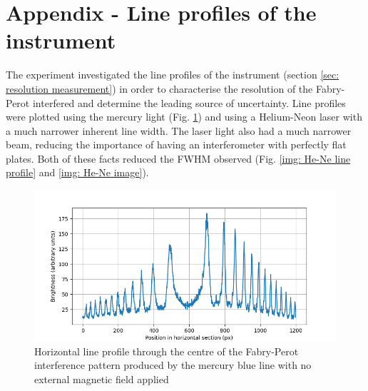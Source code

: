 \documentclass[11pt]{article}
\begin{document}
\section{Appendix - Line profiles of the instrument} \label{sec: Line profiles}
The experiment investigated the line profiles of the instrument (section \ref{sec: resolution measurement}) in order to characterise the resolution of the Fabry-Perot interfered and determine the leading source of uncertainty. Line profiles were plotted using the mercury light (Fig. \ref{img: Hg line profile}) and using a Helium-Neon laser with a much narrower inherent line width. The laser light also had a much narrower beam, reducing the importance of having an interferometer with perfectly flat plates. Both of these facts reduced the FWHM observed (Fig. \ref{img: He-Ne line profile} and \ref{img: He-Ne image}).
\begin{figure}[h!]
    \centering
    \includegraphics[width=\linewidth]{line profiles/Hg line profile no field 2.png}
    \captionsetup{justification=centering}
    \caption{Horizontal line profile through the centre of the Fabry-Perot interference pattern produced by the mercury blue line with no external magnetic field applied}
    \label{img: Hg line profile}
\end{figure}
\end{document}
